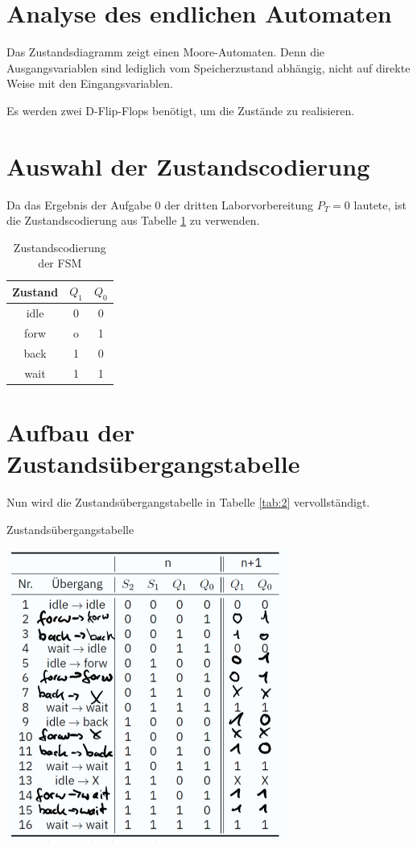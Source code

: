 \documentclass[
    paper=a4,
]{scrartcl}
\begin{document}
\section{Analyse des endlichen Automaten}
    Das Zustandsdiagramm zeigt einen Moore-Automaten. Denn die Ausgangsvariablen sind lediglich vom Speicherzustand abhängig, nicht auf direkte Weise mit den Eingangsvariablen. 

    Es werden zwei D-Flip-Flops benötigt, um die Zustände zu realisieren.

\section{Auswahl der Zustandscodierung}
    Da das Ergebnis der Aufgabe 0 der dritten Laborvorbereitung \(P_T=0\) lautete, ist die Zustandscodierung aus Tabelle \ref{tab:1} zu verwenden.

    \begin{table}
        \centering
        \caption{Zustandscodierung der FSM}
        \label{tab:1}
        \begin{tabular}{ccc}\toprule
            Zustand &   $Q_1$   &   $Q_0$\\\midrule
            idle    &   0       &   0\\
            forw    &   o       &   1\\
            back    &   1       &   0\\
            wait    &   1       &   1\\\bottomrule
        \end{tabular}
    \end{table}

\section{Aufbau der Zustandsübergangstabelle}
    Nun wird die Zustandsübergangstabelle in Tabelle \ref{tab:2} vervollständigt. 

    \begin{table}
        \centering
        \caption{Zustandsübergangstabelle}
        \label{tab:2}
        \includegraphics[width=0.7\textwidth]{Zustandsuebergang}
    \end{table}
\end{document}
